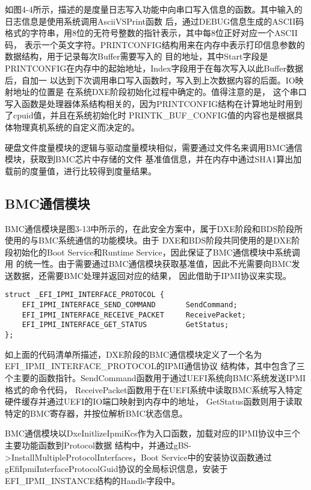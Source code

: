 如图4-4所示，描述的是度量日志写入功能中向串口写入信息的函数。其中输入的日志信息是使用系统调用AsciiVSPrint函数
后，通过DEBUG信息生成的ASCII码格式的字符串，用8位的无符号整数的指针表示，其中每8位正好对应一个ASCII码，
表示一个英文字符。PRINTCONFIG结构用来在内存中表示打印信息参数的数据结构，用于记录每次Buffer需要写入的
目的地址，其中Start字段是PRINTCONFIG在内存中的起始地址，Index字段用于在每次写入以此Buffer数据后，自加一
以达到下次调用串口写入函数时，写入到上次数据内容的后面。IO映射地址的位置是
在系统DXE阶段初始化过程中确定的。值得注意的是，
这个串口写入函数是处理器体系结构相关的，因为PRINTCONFIG结构在计算地址时用到了cpuid值，并且在系统初始化时
PRINTK\_BUF\_CONFIG值的内容也是根据具体物理真机系统的自定义而决定的\cite{chinese13}。
\par 硬盘文件度量模块的逻辑与驱动度量模块相似，需要通过文件名来调用BMC通信模块，获取到BMC芯片中存储的文件
基准值信息，并在内存中通过SHA1算出加载前的度量值，进行比较得到度量结果。

\subsection{BMC通信模块}
BMC通信模块是图3-13中所示的，在此安全方案中，属于DXE阶段和BDS阶段所使用的与BMC系统通信的功能模块。由于
DXE和BDS阶段共同使用的是DXE阶段初始化的Boot Service和Runtime Service，因此保证了BMC通信模块中系统调用
的统一性。由于需要通过BMC通信模块获取基准值，因此不光需要向BMC发送数据，还需要BMC处理并返回对应的结果，
因此借助于IPMI协议来实现\cite{chinese26}。

\begin{lstlisting}
struct _EFI_IPMI_INTERFACE_PROTOCOL {
    EFI_IPMI_INTERFACE_SEND_COMMAND       SendCommand;
    EFI_IPMI_INTERFACE_RECEIVE_PACKET     ReceivePacket;
    EFI_IPMI_INTERFACE_GET_STATUS         GetStatus;
};
\end{lstlisting}
如上面的代码清单所描述，DXE阶段的BMC通信模块定义了一个名为EFI\_IPMI\_INTERFACE\_PROTOCOL的IPMI通信协议
结构体，其中包含了三个主要的函数指针。SendCommand函数用于通过UEFI系统向BMC系统发送IPMI格式的命令代码，
ReceivePacket函数用于在UEFI系统中读取BMC系统写入特定硬件缓存并通过UEFI的IO端口映射到内存中的地址，
GetStatus函数则用于读取特定的BMC寄存器，并按位解析BMC状态信息。
\par BMC通信模块以DxeInitlizeIpmiKcs作为入口函数，加载对应的IPMI协议中三个主要功能函数到Protocol数据
结构中，并通过gBS->InstallMultipleProtocolInterfaces，Boot Service中的安装协议函数通过
gEfiIpmiInterfaceProtocolGuid协议的全局标识信息，安装于EFI\_IPMI\_INSTANCE结构的Handle字段中。

